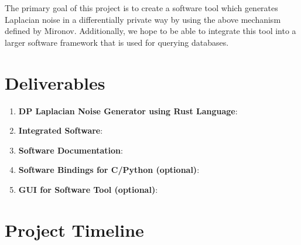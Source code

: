 \documentclass[11pt]{exam}
\begin{document}
The primary goal of this project is to create a software tool which generates Laplacian noise in a differentially private way by using the above mechanism defined by Mironov.  Additionally, we hope to be able to integrate this tool into a larger software framework that is used for querying databases.

\section{Deliverables}

\begin{enumerate}
    \item \textbf{DP Laplacian Noise Generator using Rust Language}: 
    \item \textbf{Integrated Software}: %
    \item \textbf{Software Documentation}:
    \item \textbf{Software Bindings for C/Python (optional)}: 
    \item \textbf{GUI for Software Tool (optional)}: 
\end{enumerate}

\section{Project Timeline}


\end{document}
